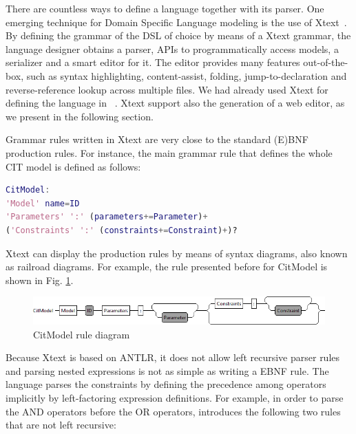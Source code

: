 \begin{tikzborder}{\cite{Gargantini16:validation}}
\begin{tikzborder}{\cite{gargantini_combinatorial_2017}}
\begin{tikzborder}{\cite{gargantini_combinatorial_2017}}
\begin{tikzborder}{\cite{garn2019}}
\begin{tikzborder}{\cite{arcaini2019achieving}}
\begin{tikzborder}{}
There are countless ways to define a language together with its parser. One emerging technique for Domain Specific Language modeling is the use of Xtext~\cite{Eysholdt:2010}. By defining the grammar of the DSL of choice by means of a Xtext grammar, the language designer obtains a parser, APIs to programmatically access models, a serializer and a smart editor for it. The editor provides many features out-of-the-box, such as syntax highlighting, content-assist, folding, jump-to-declaration and reverse-reference lookup across multiple files.  We had already used Xtext for defining the language in \citlab~\cite{citlab12}. Xtext support also the generation of a web editor, as we present in the following section.

Grammar rules written in Xtext are very close to the standard (E)BNF production rules. For instance, the main grammar rule that defines the whole CIT model is defined as follows:
\end{tikzborder}

\begin{lstlisting}[language=Matlab,columns=fullflexible,basicstyle=\small\ttfamily,stringstyle=\ttfamily\color{blue},upquote=true]  
CitModel:
'Model' name=ID 
'Parameters' ':' (parameters+=Parameter)+ 
('Constraints' ':' (constraints+=Constraint)+)?
\end{lstlisting}

\begin{tikzborder}{}
Xtext can display the production rules by means of syntax diagrams, also known as railroad diagrams. For example, the rule presented before for {\small\ttfamily CitModel} is shown in Fig. \ref{fig:grammarrule}.
\end{tikzborder}

\begin{figure}
	\centering
	\includegraphics[width=1\linewidth]{images/grammar_rule}
	\caption{{\small\ttfamily CitModel} rule diagram}
	\label{fig:grammarrule}
\end{figure}

\begin{tikzborder}{}
Because Xtext is based on ANTLR, it does not allow left recursive parser rules and parsing nested expressions is not as simple as writing a EBNF rule. The \ctwedge language parses the constraints by defining the precedence among operators implicitly by left-factoring expression definitions. For example, in order to parse the AND operators before the OR operators,  \ctwedge  introduces the following two rules that are not left recursive:
\end{tikzborder}


\end{tikzborder}
\end{tikzborder}
\end{tikzborder}
\end{tikzborder}
\end{tikzborder}
